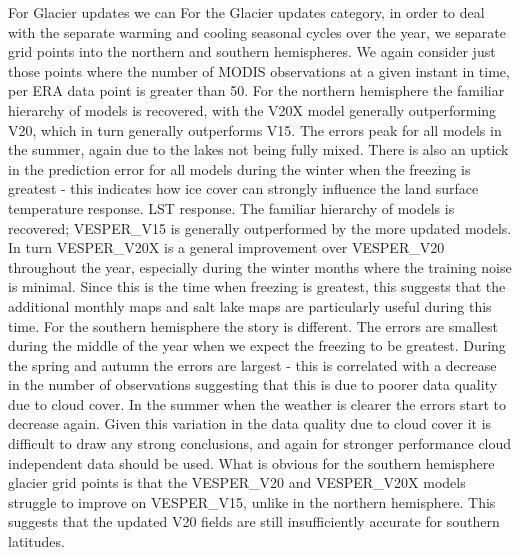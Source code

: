 \documentclass[hess, twostagejnl]{copernicus}
\providecommand{\DIFadd}[1]{{\protect\color{blue} \sf #1}} %
\providecommand{\DIFdel}[1]{{\protect\color{red} \scriptsize #1}} %
\providecommand{\DIFaddbegin}{} %
\providecommand{\DIFaddend}{} %
\providecommand{\DIFdelbegin}{} %
\providecommand{\DIFdelend}{} %
\begin{document}
\DIFdelbegin %
\DIFdel{For Glacier updates we can }\DIFdelend \DIFaddbegin \DIFadd{For the Glacier updates category, in order to deal with the separate warming and cooling seasonal cycles over the year, we }\DIFaddend separate grid points into the northern and southern hemispheres. \DIFdelbegin \DIFdel{We again consider just those points where the number of MODIS observations at a given instant in time, per ERA data point is greater than 50. }\DIFdelend For the northern hemisphere the \DIFdelbegin \DIFdel{familiar hierarchy of models is recovered, with the V20X model generally outperforming V20, which in turn generally outperforms V15. The }\DIFdelend errors peak for all models in the summer, again due to the lakes not being fully mixed. There is also an uptick in the prediction error for all models during the winter when the freezing is greatest - this indicates how ice cover can strongly influence the \DIFdelbegin \DIFdel{land surface temperature response. }\DIFdelend \DIFaddbegin \DIFadd{LST response. The familiar hierarchy of models is recovered; VESPER\_V15 is generally outperformed by the more updated models. In turn VESPER\_V20X is a general improvement over VESPER\_V20 throughout the year, especially during the winter months where the training noise is minimal. Since this is the time when freezing is greatest, this suggests that the additional monthly maps and salt lake maps are particularly useful during this time. }\DIFaddend For the southern hemisphere the story is different. The errors are smallest during the middle of the year when we expect the freezing to be greatest. During the spring and autumn the errors are largest - this is correlated with a decrease in the number of observations suggesting that this is due to poorer data quality due to cloud cover. In the summer when the weather is clearer the errors start to decrease again. Given this variation in the data quality due to cloud cover it is difficult to draw any strong conclusions, and again for stronger performance cloud independent data should be used. What is obvious for the southern hemisphere glacier grid points is that the \DIFaddbegin \DIFadd{VESPER\_}\DIFaddend V20 and \DIFaddbegin \DIFadd{VESPER\_}\DIFaddend V20X models struggle to improve on \DIFaddbegin \DIFadd{VESPER\_}\DIFaddend V15, unlike in the northern hemisphere. This suggests that the updated V20 fields are still insufficiently accurate for southern latitudes. \newline 
\end{document}
